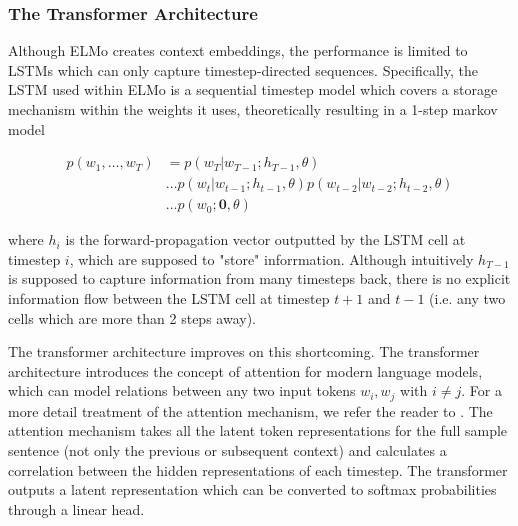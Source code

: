 \documentclass[a4paper,12pt,twoside,openright]{report}
\begin{document}
\subsubsection{The Transformer Architecture}

Although ELMo creates context embeddings, the performance is limited to LSTMs which can only capture timestep-directed sequences.
Specifically, the LSTM used within ELMo is a sequential timestep model which covers a storage mechanism within the weights it uses, theoretically resulting in a 1-step markov model

\begin{align}
p(w_1, \ldots, w_T) &= p(w_T | w_{T-1}; h_{T-1}, \theta) \nonumber  \\
& \ldots p(w_t | w_{t-1}; h_{t-1}, \theta) p(w_{t-2} | w_{t-2}; h_{t-2}, \theta) \nonumber \\
& \ldots p(w_0 ; \mathbf{0}, \theta) 
\end{align}

where $h_{i}$ is the forward-propagation vector outputted by the LSTM cell at timestep $i$, which are supposed to "store" inforrmation.
Although intuitively $h_{T-1}$ is supposed to capture information from many timesteps back, there is no explicit information flow between the LSTM cell at timestep $t+1$ and $t-1$ (i.e. any two cells which are more than 2 steps away).

The transformer architecture \cite{vaswani17} improves on this shortcoming.
The transformer architecture introduces the concept of attention for modern language models, which can model relations between any two input tokens $w_i, w_j$ with $i \neq j$.
For a more detail treatment of the attention mechanism, we refer the reader to \cite{bahdanau16}.
The attention mechanism takes all the latent token representations for the full sample sentence (not only the previous or subsequent context) and calculates a correlation between the hidden representations of each timestep.
The transformer outputs a latent representation which can be converted to softmax probabilities through a linear head.
\end{document}
